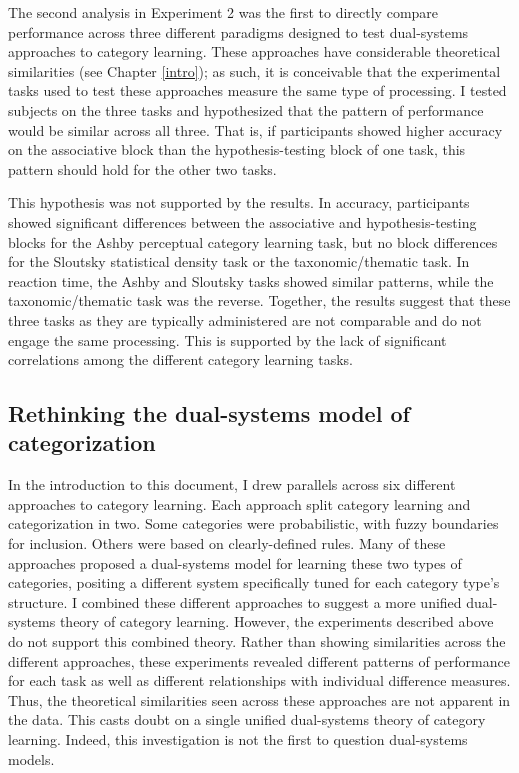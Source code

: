 \documentclass[../dissertation.tex]{subfiles}
\begin{document}
	The second analysis in Experiment 2 was the first to directly compare performance across three different paradigms designed to test dual-systems approaches to category learning. These approaches have considerable theoretical similarities (see Chapter \ref{intro}); as such, it is conceivable that the experimental tasks used to test these approaches measure the same type of processing. I tested subjects on the three tasks and hypothesized that the pattern of performance would be similar across all three. That is, if participants showed higher accuracy on the associative block than the hypothesis-testing block of one task, this pattern should hold  for the other two tasks. \par
	This hypothesis was not supported by the results. In accuracy, participants showed significant differences between the associative and hypothesis-testing blocks for the Ashby perceptual category learning task, but no block differences for the Sloutsky statistical density task or the taxonomic/thematic task. In reaction time, the Ashby and Sloutsky tasks showed similar patterns, while the taxonomic/thematic task was the reverse. Together, the results suggest that these three tasks as they are typically administered are not comparable and do not engage the same processing. This is supported by the lack of significant correlations among the different category learning tasks.

\subsection{Rethinking the dual-systems model of categorization}

	In the introduction to this document, I drew parallels across six different approaches to category learning. Each approach split category learning and categorization in two. Some categories were probabilistic, with fuzzy boundaries for inclusion. Others were based on clearly-defined rules. Many of these approaches proposed a dual-systems model for learning these two types of categories, positing a different system specifically tuned for each category type's structure. I combined these different approaches to suggest a more unified dual-systems theory of category learning. However, the experiments described above do not support this combined theory. Rather than showing similarities across the different approaches, these experiments revealed different patterns of performance for each task as well as different relationships with individual difference measures. Thus, the theoretical similarities seen across these approaches are not apparent in the data. This casts doubt on a single unified dual-systems theory of category learning. Indeed, this investigation is not the first to question dual-systems models.
\end{document}
